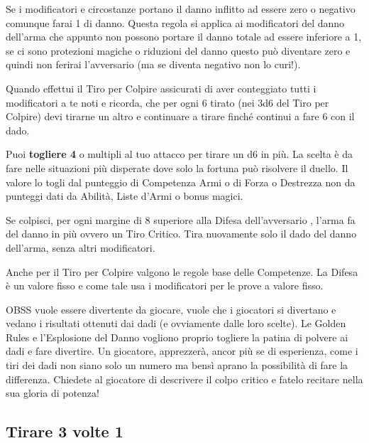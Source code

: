 \begin{multicols}{2}
Se i modificatori e circostanze portano il danno inflitto ad essere zero o negativo comunque farai 1 di danno.
Questa regola si applica ai modificatori del danno dell'arma che appunto non possono portare il danno totale ad essere inferiore a 1, se ci sono protezioni magiche o riduzioni del danno questo può diventare zero e quindi non ferirai l'avversario (ma se diventa negativo non lo curi!).

Quando effettui il Tiro per Colpire assicurati di aver conteggiato tutti i modificatori a te noti e ricorda, che per ogni 6 tirato (nei 3d6 del Tiro per Colpire) devi tirarne un altro e continuare a tirare finché continui a fare 6 con il dado.

Puoi \textbf{togliere 4} o multipli al tuo attacco per tirare un d6 in più. La scelta è da fare nelle situazioni più disperate dove solo la fortuna può risolvere il duello. Il valore lo togli dal punteggio di Competenza Armi o di Forza o Destrezza non da punteggi dati da Abilità, Liste d'Armi o bonus magici.

Se colpisci, per ogni margine di 8 superiore alla Difesa dell'avversario , l'arma fa del danno in più ovvero un Tiro Critico. Tira nuovamente solo il dado del danno dell'arma, senza altri modificatori.

Anche per il Tiro per Colpire valgono le regole base delle Competenze. La Difesa è un valore fisso e come tale usa i modificatori per le prove a valore fisso.

\begin{changemargin}{0.3cm}{0.3cm}\begin{narratore}
OBSS vuole essere divertente da giocare, vuole che i giocatori si divertano e vedano i risultati ottenuti dai dadi (e ovviamente dalle loro scelte). Le Golden Rules e l'Esplosione del Danno vogliono proprio togliere la patina di polvere ai dadi e fare divertire. Un giocatore, apprezzerà, ancor più se di esperienza, come i tiri dei dadi non siano solo un numero ma bensì aprano la possibilità di fare la differenza. Chiedete al giocatore di descrivere il colpo critico e fatelo recitare nella sua gloria di potenza!
\end{narratore}\end{changemargin}

\subsection{Tirare 3 volte 1}\label{tiraretrevolteuno}


\end{multicols}
